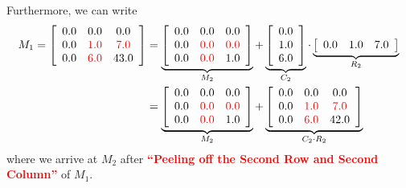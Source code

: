 Furthermore, we can write 
\begin{align*}
M_1=\left[
\begin{array}{ccc}
 0.0 &  0.0 &  0.0 \\
 0.0 & \color{red} 1.0 & \color{red} 7.0 \\
 0.0 & \color{red} 6.0 & 43.0 \\
\end{array}
\right] & = \underbrace{\left[
\begin{array}{ccc}
0.0 & 0.0 & 0.0 \\
0.0 & \color{red} 0.0 & \color{red} 0.0 \\
0.0 & \color{red} 0.0 & 1.0 \\
\end{array}
\right]}_{M_2} + \underbrace{\left[
\begin{array}{c}
0.0 \\
1.0 \\
6.0 \\
\end{array}
\right]}_{C_2} \cdot \underbrace{\left[
\begin{array}{ccc}
0.0 & 1.0 & 7.0 \\
\end{array}
\right]}_{R_2} \\
& = \underbrace{
\left[
\begin{array}{ccc}
0.0 & 0.0 & 0.0 \\
0.0 & \color{red} 0.0 & \color{red} 0.0 \\
0.0 & \color{red} 0.0 & 1.0 \\
\end{array}
\right]
}_{M_2}  + \underbrace{
\left[
\begin{array}{ccc}
0.0 & 0.0 & 0.0 \\
0.0 & \color{red} 1.0 & \color{red} 7.0 \\
0.0 & \color{red} 6.0 & 42.0 \\
\end{array}
\right]
}_{C_2 \cdot R_2}
\end{align*}
where we arrive at $M_2$ after \textcolor{red}{\bf ``Peeling off the Second Row and Second Column''} of $M_1$. \\


